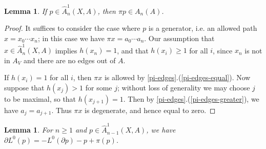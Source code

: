 \documentclass[11pt]{article}
\newtheorem{lemma}[theo]{Lemma}
\theoremstyle{definition}
\numberwithin{equation}{section}
\newcommand{\tAOne}{\widehat{A}^1}
\newcommand{\bd}{\partial}
\begin{document}
\begin{lemma}\label{pi-allowed}
If $p \in \tAOne_{n}(X,A)$, then $\pi p \in A_n(A)$.
\end{lemma}

\begin{proof}
It suffices to consider the case where $p$ is a generator, i.e. an allowed path $x = x_0 \cdots x_n$; in this case we have $\pi x = a_0 \cdots a_n$. Our assumption that $x \in \tAOne_{n}(X,A)$ implies $h(x_n) = 1$, and that $h(x_i) \geq 1$ for all $i$, since $x_n$ is not in $A_V$ and there are no edges out of $A$. 

If $h(x_i) = 1$ for all $i$, then $\pi x$ is allowed by \cref{pi-edges}.(\ref{pi-edges-equal}). Now suppose that $h(x_j) > 1$ for some $j$; without loss of generality we may choose $j$ to be maximal, so that $h(x_{j+1}) = 1$. Then by \cref{pi-edges}.(\ref{pi-edges-greater}), we have $a_j = a_{j+1}$. Thus $\pi x$ is degenerate, and hence equal to zero.
\end{proof}

\begin{lemma}\label{L-bdry}
For $n \geq 1$ and $p \in \tAOne_{n-1}(X,A)$, we have $\bd L^0(p) = -L^0(\bd p) - p + \pi(p)$.
\end{lemma}
\end{document}
